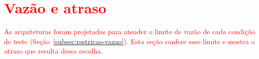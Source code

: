 \section{\texorpdfstring{\textcolor{red}{Vazão e atraso}}{Vazão e atraso}}\label{sec:resultados-atraso}

\textcolor{red}{As arquiteturas foram projetadas para atender o limite de vazão de cada condição de teste (Seção~\ref{subsec:restricao-vazao}). Esta seção confere esse limite e mostra o atraso que resulta dessa escolha.}

